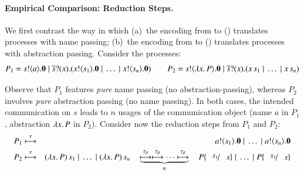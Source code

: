 \documentclass[runningheads]{llncs}
\begin{document}
{\paragraph{Empirical Comparison: Reduction Steps.}
We first contrast the way in which 
(a)~the encoding from \HOp to \HO () translates processes with name passing;
(b)~the encoding from \HOp to \sessp () translates processes with abstraction passing.
Consider the \HOp processes:
$$
P_1  =  s ! \langle a \rangle . \mathbf{0} \;|\; \overline{s} ? (x) . (x ! \langle s_1 \rangle . \mathbf{0} \;|\; \dots \;|\; x ! \langle s_n \rangle . \mathbf{0}) \qquad
P_2  =  s ! \langle \lambda x.\,P \rangle . \mathbf{0} \;|\; \overline{s} ? (x) . (x\, {s_1} \;|\; \dots \;|\; x\, {s_n})
$$

Observe that $P_1$ features \emph{pure} name passing (no abstraction-passing), whereas 
$P_2$ involves \emph{pure} abstraction passing (no name passing). In both cases, 
the intended communication on $s$ leads to $n$ usages of the communication object (name $a$ in $P_1$, abstraction $\lambda x.\,P$ in $P_2$).
Consider now the reduction steps from $P_1$ and $P_2$:
\begin{eqnarray*}
P_1 & \hby{\tau} & \bout{a}{s_1} \inact \Par \dots \Par \bout{a}{s_n} \inact \\
P_2 & \hby{\tau}& \appl{(\abs{x}{P})}{s_1} \Par \dots \Par \appl{(\abs{x}{P})}{s_n} \quad 
\underbrace{\hby{\btau}\hby{\btau} \cdots \hby{\btau}}_{n} 
\quad P \subst{s_1}{x} \Par \dots \Par P \subst{s_1}{x} 
\end{eqnarray*}

}
\end{document}
